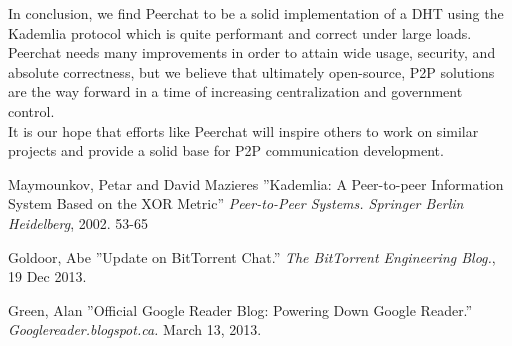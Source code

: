 \documentclass{article}
\begin{document}
In conclusion, we find Peerchat to be a solid implementation of a DHT using the Kademlia protocol which is quite performant and correct under large loads. \\

Peerchat needs many improvements in order to attain wide usage, security, and absolute correctness, but we believe that ultimately open-source, P2P solutions are the way forward in a time of increasing centralization and government control. \\

It is our hope that efforts like Peerchat will inspire others to work on similar projects and provide a solid base for P2P communication development. 

\begin{thebibliography}{99}
   Maymounkov, Petar and David Mazieres
   ''Kademlia: A Peer-to-peer Information System Based on the XOR Metric''
   \textit{Peer-to-Peer Systems. Springer Berlin Heidelberg}, 2002. 53-65

	Goldoor, Abe
	''Update on BitTorrent Chat.''
	\textit{The BitTorrent Engineering Blog.}, 19 Dec 2013.

	  Green, Alan
	  ''Official Google Reader Blog: Powering Down Google Reader.''
	  \textit{Googlereader.blogspot.ca.} March 13, 2013. 
\end{thebibliography}
\end{document}
